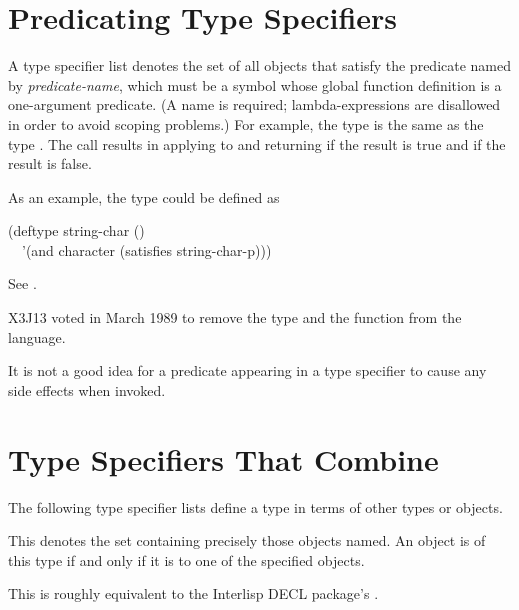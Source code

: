 \section{Predicating Type Specifiers}
\label{PREDICATING-TYPE-SPECIFIERS-SECTION}

A type specifier list  denotes
the set of all objects that satisfy the predicate named by \emph{predicate-name},
which must be a symbol whose global function definition is a one-argument
predicate.
(A name is required; lambda-expressions are disallowed in order to avoid
scoping problems.)  For example, the type  is the
same as the type .
The call  results in applying  to 
and returning  if the result is true and {\nil} if the result is false.

\begin{obsolete}
As an example, the type  could be defined as
\begin{lisp}
(deftype string-char () \\
~~'(and character (satisfies string-char-p)))
\end{lisp}
See .
\end{obsolete}

\begin{newer}
X3J13 voted in March 1989  to remove the type 
and the function  from the language.
\end{newer}

It is not a good idea for
a predicate appearing in a  type specifier to
cause any side effects when invoked.

\section{Type Specifiers That Combine}

The following type specifier lists define a type in terms of
other types or objects.

\begin{flushdesc}
\item[\cd{(member \emph{object1} \emph{object2} ...)}]
This denotes the set
containing precisely those objects named.  An object is of
this type if and only if it is  to one of the specified objects.

\beforenoterule
\begin{incompatibility}
This is roughly equivalent to
the Interlisp DECL package's .
\end{incompatibility}
\afternoterule
\end{flushdesc}

